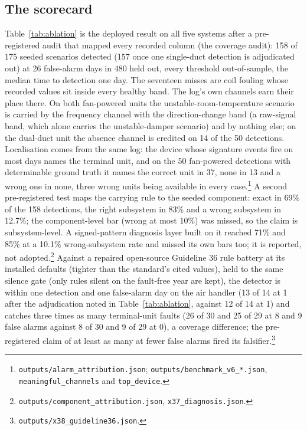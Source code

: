 \documentclass[runningheads]{llncs}
\begin{document}
\subsection{The scorecard}

Table~\ref{tab:ablation} is the deployed result on all five systems after a pre-registered audit that mapped every recorded column (the coverage audit): 158 of 175 seeded scenarios detected (157 once one single-duct detection is adjudicated out) at 26 false-alarm days in 480 held out, every threshold out-of-sample, the median time to detection one day. The seventeen misses are coil fouling whose recorded values sit inside every healthy band. The log's own channels earn their place there. On both fan-powered units the unstable-room-temperature scenario is carried by the frequency channel with the direction-change band (a raw-signal band, which alone carries the unstable-damper scenario) and by nothing else; on the dual-duct unit the absence channel is credited on 14 of the 50 detections. Localisation comes from the same log: the device whose signature events fire on most days names the terminal unit, and on the 50 fan-powered detections with determinable ground truth it names the correct unit in 37, none in 13 and a wrong one in none, three wrong units being available in every case.\footnote{\texttt{outputs/alarm\_attribution.json}; \texttt{outputs/benchmark\_v6\_*.json}, \texttt{meaningful\_channels} and \texttt{top\_device}.} A second pre-registered test maps the carrying rule to the seeded component: exact in 69\% of the 158 detections, the right subsystem in 83\% and a wrong subsystem in 12.7\%; the component-level bar (wrong at most 10\%) was missed, so the claim is subsystem-level. A signed-pattern diagnosis layer built on it reached 71\% and 85\% at a 10.1\% wrong-subsystem rate and missed its own bars too; it is reported, not adopted.\footnote{\texttt{outputs/component\_attribution.json}, \texttt{x37\_diagnosis.json}.} Against a repaired open-source Guideline 36 rule battery at its installed defaults (tighter than the standard's cited values), held to the same silence gate (only rules silent on the fault-free year are kept), the detector is within one detection and one false-alarm day on the air handler (13 of 14 at 1 after the adjudication noted in Table~\ref{tab:ablation}, against 12 of 14 at 1) and catches three times as many terminal-unit faults (26 of 30 and 25 of 29 at 8 and 9 false alarms against 8 of 30 and 9 of 29 at 0), a coverage difference; the pre-registered claim of at least as many at fewer false alarms fired its falsifier.\footnote{\texttt{outputs/x38\_guideline36.json}.}
\end{document}

